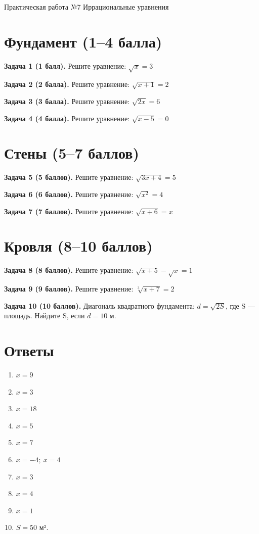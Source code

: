 \documentclass{umk-matematika}
\begin{document}
\maketitlepage
    {Практическая работа №7}
    {Иррациональные уравнения}
    {}

\section{Фундамент (1--4 балла)}

\textbf{Задача 1 (1 балл).} Решите уравнение: $\sqrt{x} = 3$

\textbf{Задача 2 (2 балла).} Решите уравнение: $\sqrt{x + 1} = 2$

\textbf{Задача 3 (3 балла).} Решите уравнение: $\sqrt{2x} = 6$

\textbf{Задача 4 (4 балла).} Решите уравнение: $\sqrt{x - 5} = 0$

\section{Стены (5--7 баллов)}

\textbf{Задача 5 (5 баллов).} Решите уравнение: $\sqrt{3x + 4} = 5$

\textbf{Задача 6 (6 баллов).} Решите уравнение: $\sqrt{x^2} = 4$

\textbf{Задача 7 (7 баллов).} Решите уравнение: $\sqrt{x + 6} = x$

\section{Кровля (8--10 баллов)}

\textbf{Задача 8 (8 баллов).} Решите уравнение: $\sqrt{x + 5} - \sqrt{x} = 1$

\textbf{Задача 9 (9 баллов).} Решите уравнение: $\sqrt[3]{x + 7} = 2$

\textbf{Задача 10 (10 баллов).} Диагональ квадратного фундамента: $d = \sqrt{2S}$, где S — площадь. Найдите S, если $d = 10$ м.

\newpage
\section*{Ответы}

\begin{enumerate}
  \item $x = 9$
  \item $x = 3$
  \item $x = 18$
  \item $x = 5$
  \item $x = 7$
  \item $x = -4;\ x = 4$
  \item $x = 3$
  \item $x = 4$
  \item $x = 1$
  \item $S = 50$ м².
\end{enumerate}
\end{document}
